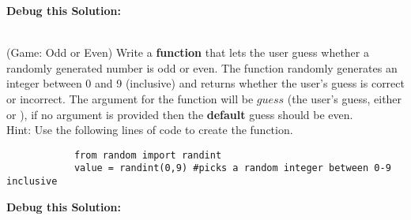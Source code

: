 		\textbf{Debug this Solution:}\\
		\mbox{ \hspace*{0.25in}	}

\pagebreak




	\item
		(Game: Odd or Even)  Write a \textbf{function} that lets the user guess whether a randomly 
		generated number is odd or even.  The function randomly generates an integer between 0 and 9 
		(inclusive) and returns whether the user's guess is correct or incorrect. The argument for 
		the function will be $guess$ (the user's guess, either  or ), if no 
		argument is provided then the \textbf{default} guess should be even.\\
		Hint: Use the following lines of code to create the function.
		\begin{verbatim}
		    from random import randint
		    value = randint(0,9) #picks a random integer between 0-9 inclusive
		\end{verbatim}

		\textbf{Debug this Solution:}\\
		\mbox{ \hspace*{0.25in}	}


\pagebreak



